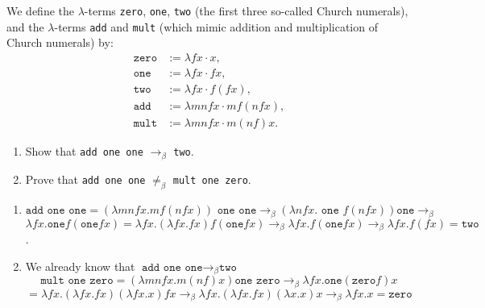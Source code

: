 \begin{problem}{1.10}
    We define the $\lambda$-terms \texttt{zero}, \texttt{one}, \texttt{two} (the first three so-called Church numerals), and the $\lambda$-terms \texttt{add} and \texttt{mult} (which mimic addition and multiplication of Church numerals) by:
\begin{align*}
\texttt{zero} &:= \lambda f x \cdot x, \\
\texttt{one} &:= \lambda f x \cdot f x, \\
\texttt{two} &:= \lambda f x \cdot f(f x), \\
\texttt{add} &:= \lambda mn f x \cdot m f(n f x), \\
\texttt{mult} &:= \lambda mn f x \cdot m(n f)x.
\end{align*}
    \begin{enumerate}[label=$(\alph*)$]
        \item Show that \texttt{add one one} $\rightarrow_{\beta}$ \texttt{two}.
        \item Prove that \texttt{add one one} $\neq_{\beta}$ \texttt{mult one zero}.
    \end{enumerate}
\end{problem}

\begin{solution}
    \begin{enumerate}[label=$(\alph*)$]
        \item $ \texttt{add one one} = (\lambda mnfx.mf(nfx)) \texttt{ one one} \to_\beta (\lambda nfx.\texttt{ one } f(nfx)) \texttt{one} \to_\beta $
                $ \lambda fx. \texttt{one} f(\texttt{one} fx) = \lambda fx.(\lambda fx.fx) f (\texttt{one} fx) \to_\beta \lambda fx. f(\texttt{one}fx) \to_\beta \lambda fx.f(fx) = \texttt{two} $.
        \item We already know that $\texttt{add one one} \to_\beta \texttt{two}$
                $$  \texttt{mult one zero} = (\lambda mnfx.m(nf)x) \texttt{one zero} \to_\beta \lambda fx.\texttt{one}(\texttt{zero}f)x $$
                    $$ = \lambda fx. (\lambda fx.fx)(\lambda fx.x)fx \to_\beta \lambda fx.(\lambda fx.fx)(\lambda x.x)x \to_\beta \lambda fx.x = \texttt{zero} $$
    \end{enumerate}
\end{solution}